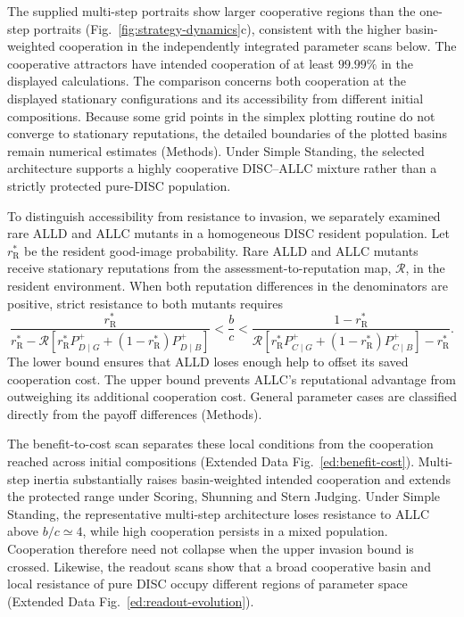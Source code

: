 \documentclass[fleqn,10pt]{article}
\begin{document}
The supplied multi-step portraits show larger cooperative regions than the one-step portraits (Fig.~\ref{fig:strategy-dynamics}c), consistent with the higher basin-weighted cooperation in the independently integrated parameter scans below. The cooperative attractors have intended cooperation of at least $99.99\%$ in the displayed calculations. The comparison concerns both cooperation at the displayed stationary configurations and its accessibility from different initial compositions. Because some grid points in the simplex plotting routine do not converge to stationary reputations, the detailed boundaries of the plotted basins remain numerical estimates (Methods). Under Simple Standing, the selected architecture supports a highly cooperative DISC--ALLC mixture rather than a strictly protected pure-DISC population.

To distinguish accessibility from resistance to invasion, we separately examined rare ALLD and ALLC mutants in a homogeneous DISC resident population. Let $r_{\mathrm R}^*$ be the resident good-image probability. Rare ALLD and ALLC mutants receive stationary reputations from the assessment-to-reputation map, $\mathcal R$, in the resident environment. When both reputation differences in the denominators are positive, strict resistance to both mutants requires
\begin{equation}
\frac{r_{\mathrm R}^*}{r_{\mathrm R}^*-\mathcal R\!\left[r_{\mathrm R}^*P^+_{D\mid G}+(1-r_{\mathrm R}^*)P^+_{D\mid B}\right]}
<\frac bc<
\frac{1-r_{\mathrm R}^*}{\mathcal R\!\left[r_{\mathrm R}^*P^+_{C\mid G}+(1-r_{\mathrm R}^*)P^+_{C\mid B}\right]-r_{\mathrm R}^*}.
\label{eq:canonical-window}
\end{equation}
The lower bound ensures that ALLD loses enough help to offset its saved cooperation cost. The upper bound prevents ALLC's reputational advantage from outweighing its additional cooperation cost. General parameter cases are classified directly from the payoff differences (Methods).

The benefit-to-cost scan separates these local conditions from the cooperation reached across initial compositions (Extended Data Fig.~\ref{ed:benefit-cost}). Multi-step inertia substantially raises basin-weighted intended cooperation and extends the protected range under Scoring, Shunning and Stern Judging. Under Simple Standing, the representative multi-step architecture loses resistance to ALLC above $b/c\simeq4$, while high cooperation persists in a mixed population. Cooperation therefore need not collapse when the upper invasion bound is crossed. Likewise, the readout scans show that a broad cooperative basin and local resistance of pure DISC occupy different regions of parameter space (Extended Data Fig.~\ref{ed:readout-evolution}).
\end{document}
